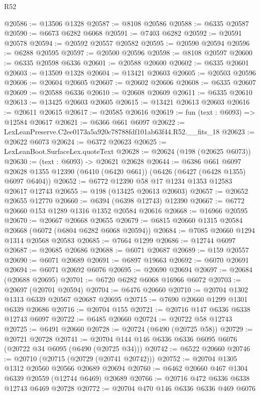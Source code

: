 \begin{lexlean}{R52}
\begin{coremodule}
@20586 := @13506 @1328
@20587 := @8108 @20586
@20588 := @6335 @20587
@20590 := @6673 @6282 @6068
@20591 := @7403 @6282
@20592 := @20591 @20578
@20594 := @20592 @20557 @20582
@20595 := @20590 @20594
@20596 := @6288 @20595
@20597 := @20500 @20596
@20598 := @8108 @20597
@20600 := @6335 @20598 @6336
@20601 := @20588 @20600
@20602 := @6335 @20601
@20603 := @13509 @1328
@20604 := @13421 @20603
@20605 := @20503 @20596
@20606 := @20604 @20605
@20607 := @20602 @20606
@20608 := @6335 @20607
@20609 := @20588 @6336
@20610 := @20608 @20609
@20611 := @6335 @20610
@20613 := @13425 @20603 @20605
@20615 := @13421 @20613 @20603
@20616 := @20611 @20615
@20617 := @20585 @20616
@20619 := fun (text : @6093) => @12584 @20617
@20621 := @6366 @661 @6097
@20622 := LexLeanPreserve.C2ee0173a5a920c78788fdf101ab63f44.R52.__fits_18
@20623 := @20622 @6073
@20624 := @6372 @20623
@20625 := LexLeanBoot.SurfaceLex.quoteText
@20628 := @20624 (@198 (@20625 @6073))
@20630 := (text : @6093) -> @20621 @20628
@20644 := @6386
    @661
    @6097
    @20628
    @1355
    @12390
    (@6410 (@6420 @661))
    (@6426 (@6427 (@6428 @1355) @6097 @6404))
@20652 := @6772 @12390 @58 @17 @1234 @1353 @12583 @20617 @12743
@20655 := @198 (@13425 @20613 @20603)
@20657 := @20652 @20655 @12770
@20660 := @6394 (@6398 @12743) @12390
@20667 := @6772 @20660 @153 @1289 @1316 @1352 @20584 @20616
@20668 := @16966 @20595
@20670 := @20667 @20668 @20655
@20679 := @6815 @20660 @1315 @20584 @20668 (@6072 (@6804 @6282 @6068 @20594))
@20684 := @7085 @20660 @1294 @1314 @20568 @20583
@20685 := @7664 @1299
@20686 := @12744 @6097
@20687 := @20685 @20686
@20688 := @6071 @20687
@20689 := @159 @20557
@20690 := @6071 @20689
@20691 := @6897 @19663
@20692 := @6070 @20691
@20694 := @6071 @20692 @6076
@20695 := @20690 @20694
@20697 := @20684 (@20688 @20695)
@20701 := @6720 @6282 @6068 @16966 @6072
@20703 := @20697 (@20701 @20594)
@20704 := @6476 @20660
@20710 := @20704 @1302 @1313 @6339 @20567 @20687 @20695
@20715 := @7690 @20660 @1299 @1301 @6339 @20686
@20716 := @20704 @155
@20721 := @20716 @147 @6336 @6338 @12743 @6097
@20722 := @6485 @20660
@20724 := @20722 @58 @12743
@20725 := @6491 @20660
@20728 := @20724 (@6490 (@20725 @58))
@20729 := @20721 @20728
@20741 := @20704 @144 @146 @6336 @6336 @6095 @6076 (@20722 @34 @6095 (@6490 (@20725 @34)))
@20742 := @6522 @20660
@20746 := @20710 (@20715 (@20729 (@20741 @20742)))
@20752 := @20704 @1305 @1312 @20560 @20566 @20689 @20694
@20760 := @6462 @20660 @467 @1304 @6339 @20559 (@12744 @6469) @20689
@20766 := @20716 @472 @6336 @6338 @12743 @6469 @20728
@20772 := @20704 @470 @146 @6336 @6336 @469 @6076

\end{coremodule}
\end{lexlean}
